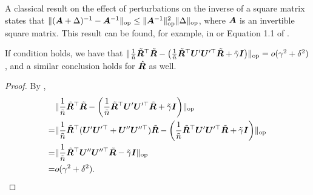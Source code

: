 \begin{lemma}\label{lemma: perturb_inv}
A classical result on the effect of perturbations on the inverse of a square matrix states that $\lVert ({\bm{A}} + \Delta)^{-1} - {\bm{A}}^{-1} \rVert_{\mathrm{op}} \leq \lVert {\bm{A}}^{-1} \rVert_{\mathrm{op}}^2 \lVert \Delta \rVert_{\mathrm{op}}$, where ${\bm{A}}$ is an invertible square matrix. This result can be found, for example, in \cite{demmel1992componentwise} or Equation 1.1 of \cite{el2002inversion}.
\end{lemma}

\begin{lemma}\label{lemma: isotropy_eff_reg_kernel}
    If condition \isotropy{} holds, we have that $ \lVert  \frac{1}{\tilde{n}}\tilde{{\bm{R}}}^\top \tilde{{\bm{R}}} - \left( \frac{1}{\tilde{n}}\tilde{{\bm{R}}}^\top{\bm{U}}'{\bm{U}}'^\top\tilde{{\bm{R}}} + \tilde{\gamma}{\bm{I}}  \right)  \rVert_{\mathrm{op}} =o(\gamma^2+\delta^2)$, and a similar conclusion holds for $\hat{{\bm{R}}}$ as well.
\end{lemma}
\begin{proof}
By \isotropy{},
    \begin{align}
        \nonumber
       & \lVert  \frac{1}{\tilde{n}}\tilde{{\bm{R}}}^\top \tilde{{\bm{R}}} - \left( \frac{1}{\tilde{n}}\tilde{{\bm{R}}}^\top{\bm{U}}'{\bm{U}}'^\top\tilde{{\bm{R}}} + \tilde{\gamma}{\bm{I}}  \right)  \rVert_{\mathrm{op}}\\
        \nonumber
        = & \lVert  \frac{1}{\tilde{n}}\tilde{{\bm{R}}}^\top ({\bm{U}}'{\bm{U}}'^\top+{\bm{U}}''{\bm{U}}''^\top) \tilde{{\bm{R}}} - \left( \frac{1}{\tilde{n}}\tilde{{\bm{R}}}^\top{\bm{U}}'{\bm{U}}'^\top\tilde{{\bm{R}}} + \tilde{\gamma}{\bm{I}}  \right)  \rVert_{\mathrm{op}}\\
        \nonumber
        = &  \lVert  \frac{1}{\tilde{n}}\tilde{{\bm{R}}}^\top {\bm{U}}''{\bm{U}}''^\top \tilde{{\bm{R}}} - \tilde{\gamma}{\bm{I}}  \rVert_{\mathrm{op}}\\
        \nonumber
        = & o(\gamma^2+\delta^2). 
    \end{align}
\end{proof}

